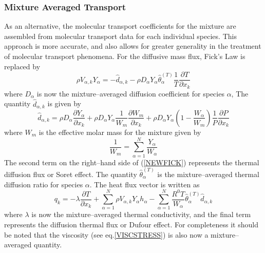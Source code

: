 \documentclass[dvips]{article}
\begin{document}
\subsubsection{Mixture Averaged Transport}
As an alternative, the molecular transport coefficients for the mixture
are assembled from molecular transport data for each individual species.
This approach is more accurate, and also allows for greater generality in the
treatment of molecular transport phenomena.  For the diffusive mass flux,
Fick's Law is replaced by
\begin{equation}
\rho V_{\alpha,k} Y_{\alpha} =
- \hat{d}_{\alpha,k}
- \rho D_{\alpha} Y_{\alpha}
\hat{\theta}_{\alpha}^{(T)}\frac{1}{T}\frac{\partial T}{\partial x_{k}}
\label{NEWFICK}
\end{equation}
where $D_{\alpha}$ is now the mixture--averaged diffusion coefficient for
species $\alpha$,  The quantity $\hat{d}_{\alpha,k}$ is given by
\begin{equation}
\hat{d}_{\alpha,k} =
 \rho D_{\alpha}\frac{\partial Y_{\alpha}}{\partial x_{k}}
+\rho D_{\alpha}Y_{\alpha}\frac{1}{W_{m}}\frac{\partial W_{m}}{\partial x_{k}}
+\rho D_{\alpha}Y_{\alpha}\left(1-\frac{W_{\alpha}}{W_{m}}\right)
\frac{1}{P}\frac{\partial P}{\partial x_{k}}
\label{DEEHAT}
\end{equation}
where $W_{m}$ is the effective molar mass for the mixture given by
\begin{equation}
\frac{1}{W_{m}} = \sum_{\alpha=1}^{N}\frac{Y_{\alpha}}{W_{\alpha}}
\end{equation}
The second term on the right--hand side of (\ref{NEWFICK}) represents the
thermal diffusion flux or Soret effect.  The quantity
$\hat{\theta}_{\alpha}^{(T)}$ is the mixture--averaged thermal diffusion ratio
for species $\alpha$.  The heat flux vector is written as
\begin{equation}
q_{k} = -\lambda\frac{\partial T}{\partial x_{k}} +
\sum_{\alpha=1}^{N}\rho V_{\alpha,k} Y_{\alpha} h_{\alpha}
-\sum_{\alpha=1}^{N}\frac{R^{0}T}{W_{\alpha}}
\hat{\theta}_{\alpha}^{(T)}\hat{d}_{\alpha,k}
\label{QMAV}
\end{equation}
where $\lambda$ is now the mixture--averaged thermal conductivity, and the
final term represents the diffusion thermal flux or Dufour effect.  For
completeness it should be noted that the viscosity (see
eq.\ref{VISCSTRESS}) is also now a mixture--averaged quantity. 
\end{document}
